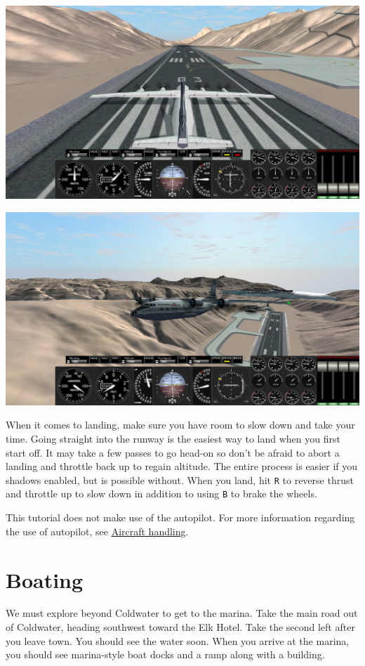 \includegraphics{images/bg-plane1.png}

\includegraphics{images/bg-plane2.png}

When it comes to landing, make sure you have room to slow down and take
your time. Going straight into the runway is the easiest way to land
when you first start off. It may take a few passes to go head-on so
don't be afraid to abort a landing and throttle back up to regain
altitude. The entire process is easier if you shadows enabled, but is
possible without. When you land, hit \texttt{R} to reverse thrust and
throttle up to slow down in addition to using \texttt{B} to brake the
wheels.

This tutorial does not make use of the autopilot. For more information
regarding the use of autopilot, see
\href{/gameplay/aircraft-handling/}{Aircraft handling}.

\hypertarget{boating}{%
\section{Boating}\label{boating}}

We must explore beyond Coldwater to get to the marina. Take the main
road out of Coldwater, heading southwest toward the Elk Hotel. Take the
second left after you leave town. You should see the water soon. When
you arrive at the marina, you should see marina-style boat docks and a
ramp along with a building.

